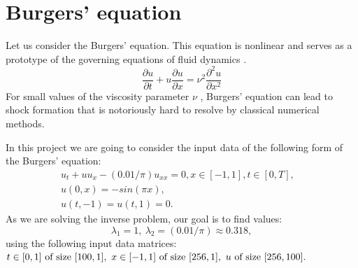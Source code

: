 \documentclass{beamer}
\begin{document}

\section{Burgers' equation}

\begin{frame}

Let us consider the Burgers' equation. This equation is nonlinear and serves as a prototype of the governing equations of fluid dynamics \cite{comp1986fluids}. 
\begin{equation}
    \frac{\partial u}{\partial t} + u \frac{\partial u}{\partial x} = \nu^2 \frac{\partial^2 u}{\partial x^2}
\end{equation}
For small values of the viscosity parameter $\nu$ , Burgers' equation can lead to shock formation that is notoriously hard to resolve by classical numerical methods. 

\end{frame}

\begin{frame}
In this project we are going to consider the input data of the following form of the Burgers' equation:
\begin{align}

u_t + u u_x - (0.01/\pi)u_{xx} = 0, x \in [-1, 1], t \in [0, T], &\\
u(0, x) = -sin(\pi x), & \\
u(t, -1) = u(t, 1) = 0.
\end{align}
As we are solving the inverse problem, our goal is to find values:
$$\lambda_1 = 1, ~ \lambda_2 = (0.01 / \pi) \approx 0.318, $$ using the following input data matrices:
$t \in [0, 1] \text{ of size } [100, 1], \\ ~ x \in [-1, 1] \text{ of size } [256, 1],~ u \text{ of size } [256, 100].$

\end{frame}
\end{document}
